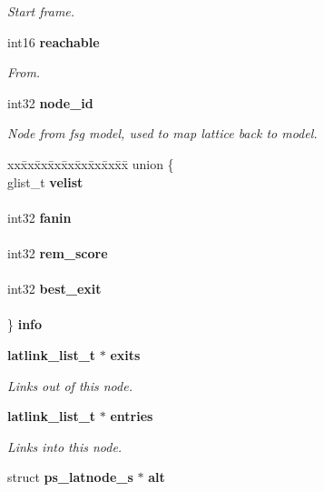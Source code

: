 \begin{DoxyCompactItemize}
\begin{DoxyCompactList}\small\item\em Start frame. \end{DoxyCompactList}\item 
int16 {\bf reachable}
\begin{DoxyCompactList}\small\item\em From. \end{DoxyCompactList}\item 
int32 {\bf node\-\_\-id}\label{structps__latnode__s_a50d14c033652a4fb387f76881df1c3f6}

\begin{DoxyCompactList}\small\item\em Node from fsg model, used to map lattice back to model. \end{DoxyCompactList}\item 
\begin{tabbing}
xx\=xx\=xx\=xx\=xx\=xx\=xx\=xx\=xx\=\kill
union \{\\
\>glist\_t {\bf velist}\\
\>\\
\>int32 {\bf fanin}\\
\>\\
\>int32 {\bf rem\_score}\\
\>\\
\>int32 {\bf best\_exit}\\
\>\\
\} {\bfseries info}\label{structps__latnode__s_a08268f9ec02dc27bead7ad7524838969}
\\

\end{tabbing}\item 
{\bf latlink\-\_\-list\-\_\-t} $\ast$ {\bf exits}\label{structps__latnode__s_a5232eefbc6e800b77e7a3c8ee3f4135d}

\begin{DoxyCompactList}\small\item\em Links out of this node. \end{DoxyCompactList}\item 
{\bf latlink\-\_\-list\-\_\-t} $\ast$ {\bf entries}\label{structps__latnode__s_a051a7eed31e29dd75151d1b34cc4eefa}

\begin{DoxyCompactList}\small\item\em Links into this node. \end{DoxyCompactList}\item 
struct {\bf ps\-\_\-latnode\-\_\-s} $\ast$ {\bf alt}\label{structps__latnode__s_aa4c0a395c74acbacccde561f92fa89e4}


\end{DoxyCompactItemize}
